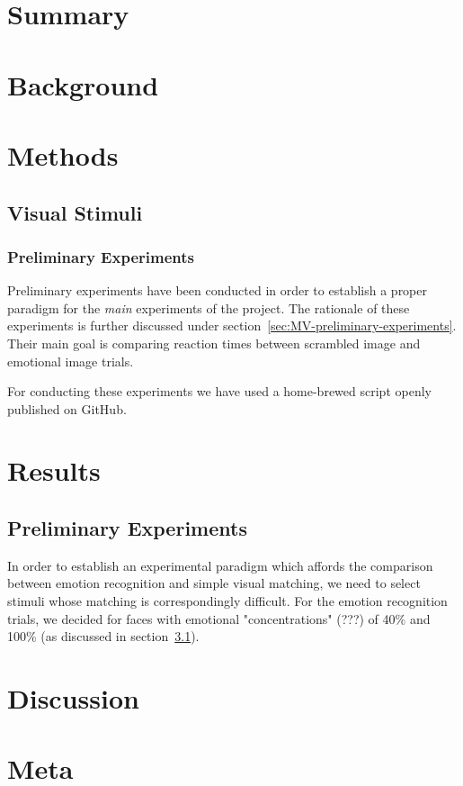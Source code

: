 
\chapter{Summary}
\readme
\chapter{Background}
\chapter{Methods}
    \section{Visual Stimuli}\label{sec:visual-stimuli}
	\subsection{Preliminary Experiments} 
	Preliminary experiments have been conducted in order to establish a proper paradigm for the \textit{main} experiments of the project. 
	The rationale of these experiments is further discussed under section~\ref{sec:MV-preliminary-experiments}. 
	Their main goal is comparing reaction times between scrambled image and emotional image trials.
	
	For conducting these experiments we have used a home-brewed script openly published on GitHub.
\chapter{Results}
	\section{Preliminary Experiments}
	In order to establish an experimental paradigm which affords the comparison between emotion recognition and simple visual matching, we need to select stimuli whose matching is correspondingly difficult.
	For the emotion recognition trials, we decided for faces with emotional "concentrations" (???) of 40\% and 100\% (as discussed in section~\ref{sec:visual-stimuli}).
\chapter{Discussion}
\chapter{Meta}


